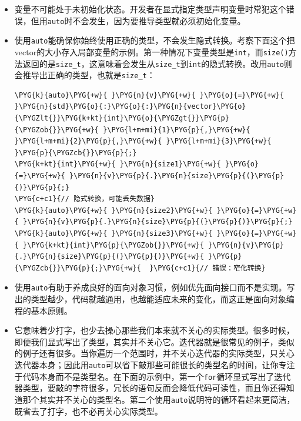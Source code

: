 \begin{itemize}
\item 变量不可能处于未初始化状态。开发者在显式指定类型声明变量时常犯这个错误，但用\texttt{auto}时不会发生，因为要推导类型就必须初始化变量。



\item 使用\texttt{auto}能确保你始终使用正确的类型，不会发生隐式转换。考察下面这个把vector的大小存入局部变量的示例。第一种情况下变量类型是\texttt{int}，而\texttt{size()}方法返回的是\texttt{size\_\allowbreak{}t}，这意味着会发生从\texttt{size\_\allowbreak{}t}到\texttt{int}的隐式转换。改用\texttt{auto}则会推导出正确的类型，也就是\texttt{size\_\allowbreak{}t}：



\begin{codeblockbg}
\begin{Verbatim}[commandchars=\\\{\},breaklines=true,breakanywhere=true,fontsize=\codefont,xleftmargin=17bp]
\PYG{k}{auto}\PYG{+w}{ }\PYG{n}{v}\PYG{+w}{ }\PYG{o}{=}\PYG{+w}{ }\PYG{n}{std}\PYG{o}{:}\PYG{o}{:}\PYG{n}{vector}\PYG{o}{\PYGZlt{}}\PYG{k+kt}{int}\PYG{o}{\PYGZgt{}}\PYG{p}{\PYGZob{}}\PYG{+w}{ }\PYG{l+m+mi}{1}\PYG{p}{,}\PYG{+w}{ }\PYG{l+m+mi}{2}\PYG{p}{,}\PYG{+w}{ }\PYG{l+m+mi}{3}\PYG{+w}{ }\PYG{p}{\PYGZcb{}}\PYG{p}{;}
\PYG{k+kt}{int}\PYG{+w}{ }\PYG{n}{size1}\PYG{+w}{ }\PYG{o}{=}\PYG{+w}{ }\PYG{n}{v}\PYG{p}{.}\PYG{n}{size}\PYG{p}{(}\PYG{p}{)}\PYG{p}{;}
\PYG{c+c1}{// 隐式转换，可能丢失数据}
\PYG{k}{auto}\PYG{+w}{ }\PYG{n}{size2}\PYG{+w}{ }\PYG{o}{=}\PYG{+w}{ }\PYG{n}{v}\PYG{p}{.}\PYG{n}{size}\PYG{p}{(}\PYG{p}{)}\PYG{p}{;}
\PYG{k}{auto}\PYG{+w}{ }\PYG{n}{size3}\PYG{+w}{ }\PYG{o}{=}\PYG{+w}{ }\PYG{k+kt}{int}\PYG{p}{\PYGZob{}}\PYG{+w}{ }\PYG{n}{v}\PYG{p}{.}\PYG{n}{size}\PYG{p}{(}\PYG{p}{)}\PYG{+w}{ }\PYG{p}{\PYGZcb{}}\PYG{p}{;}\PYG{+w}{  }\PYG{c+c1}{// 错误：窄化转换}
\end{Verbatim}
\end{codeblockbg}



\item 使用\texttt{auto}有助于养成良好的面向对象习惯，例如优先面向接口而不是实现。写出的类型越少，代码就越通用，也越能适应未来的变化，而这正是面向对象编程的基本原则。



\item 它意味着少打字，也少去操心那些我们本来就不关心的实际类型。很多时候，即便我们显式写出了类型，其实并不关心它。迭代器就是很常见的例子，类似的例子还有很多。当你遍历一个范围时，并不关心迭代器的实际类型，只关心迭代器本身；因此用\texttt{auto}可以省下敲那些可能很长的类型名的时间，让你专注于代码本身而不是类型名。在下面的示例中，第一个\texttt{for}循环显式写出了迭代器类型，要敲的字符很多，冗长的语句反而会降低代码可读性，而且你还得知道那个其实并不关心的类型名。第二个使用\texttt{auto}说明符的循环看起来更简洁，既省去了打字，也不必再关心实际类型。



\end{itemize}
